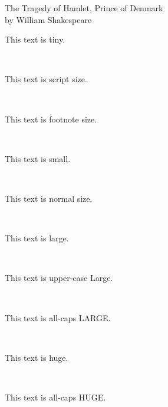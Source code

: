 \documentclass{article}
\begin{document}
\begin{center}
\Large
The Tragedy of Hamlet, Prince of Denmark\\
\tiny
by William Shakespeare
\end{center}

\noindent %
\begin{tiny}This text is tiny.\end{tiny} \\
\begin{scriptsize}This text is script size.\end{scriptsize} \\
\begin{footnotesize}This text is footnote size.\end{footnotesize} \\
\begin{small}This text is small.\end{small} \\
\begin{normalsize}This text is normal size.\end{normalsize} \\
\begin{large}This text is large.\end{large} \\
\begin{Large}This text is upper-case Large.\end{Large} \\
\begin{LARGE}This text is all-caps LARGE.\end{LARGE} \\
\begin{huge}This text is huge.\end{huge} \\
\begin{Huge}This text is all-caps HUGE.\end{Huge} \\
\end{document}
